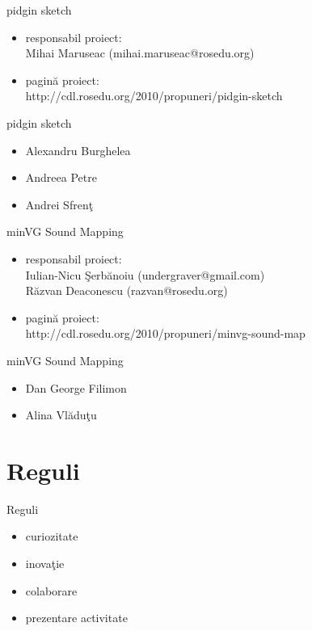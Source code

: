 \documentclass{beamer}
\begin{document}
\begin{frame}{pidgin sketch}
  \begin{itemize} %
  \pause
  \item responsabil proiect: \\ Mihai Maruseac (mihai.maruseac@rosedu.org)
  \pause
  \item pagină proiect: \\ http://cdl.rosedu.org/2010/propuneri/pidgin-sketch
  \end{itemize}
\end{frame}

\begin{frame}{pidgin sketch}
  \begin{itemize} %
  \pause
  \item Alexandru Burghelea
  \pause
  \item Andreea Petre
  \pause
  \item Andrei Sfrenţ
  \end{itemize}
\end{frame}

\begin{frame}{minVG Sound Mapping}
  \begin{itemize} %
  \pause
  \item responsabil proiect: \\ Iulian-Nicu Şerbănoiu (undergraver@gmail.com) \\ Răzvan Deaconescu (razvan@rosedu.org)
  \pause
  \item pagină proiect: \\ http://cdl.rosedu.org/2010/propuneri/minvg-sound-map
  \end{itemize}
\end{frame}

\begin{frame}{minVG Sound Mapping}
  \begin{itemize} %
  \pause
  \item Dan George Filimon
  \pause
  \item Alina Vlăduţu
  \end{itemize}
\end{frame}

\section{Reguli}

\begin{frame}{Reguli}
  \begin{itemize} %
  \pause
  \item curiozitate
  \pause
  \item inovaţie
  \pause
  \item colaborare
  \pause
  \item prezentare activitate
  \end{itemize}
\end{frame}
\end{document}

